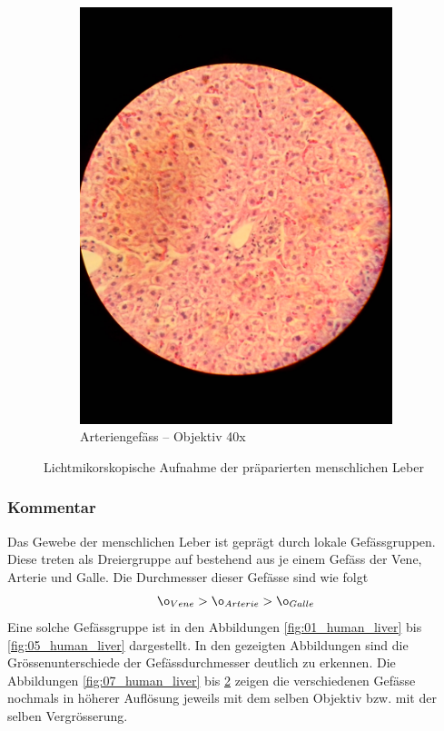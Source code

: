 \begin{figure}[h!]
\begin{subfigure}[b]{0.3\textwidth}
		\includegraphics[width=1\textwidth]{../images/10_human_liver.jpg}
		\caption{Arteriengefäss -- Objektiv 40x}
		\label{fig:10_human_liver}
	\end{subfigure}
	\caption{Lichtmikorskopische Aufnahme der präparierten menschlichen
		Leber}
\end{figure}

\subsubsection{Kommentar}
Das Gewebe der menschlichen Leber ist geprägt durch lokale Gefässgruppen.
Diese treten als Dreiergruppe auf bestehend aus je einem Gefäss der Vene,
Arterie und Galle. Die Durchmesser dieser Gefässe sind wie folgt
\[ 
	\o_{Vene} > \o_{Arterie} > \o_{Galle}
\]
Eine solche Gefässgruppe ist in den Abbildungen \ref{fig:01_human_liver}
bis \ref{fig:05_human_liver} dargestellt. In den gezeigten Abbildungen
sind die Grössenunterschiede der Gefässdurchmesser deutlich zu erkennen.
Die Abbildungen \ref{fig:07_human_liver} bis \ref{fig:10_human_liver}
zeigen die verschiedenen Gefässe nochmals in höherer Auflösung jeweils
mit dem selben Objektiv bzw. mit der selben Vergrösserung.

